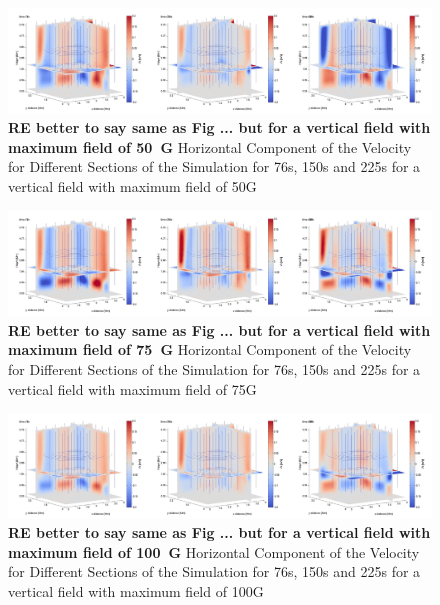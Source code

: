 \documentclass{aastex62}
\begin{document}
\begin{figure}[h]\label{vxplot_bv50g_76_150_225}
\includegraphics[scale=0.15]{imrescale/vx_bv50g_76_150_225.jpg}
\caption{{\bf RE better to say same as Fig ... but for a vertical field with maximum field of 50~G} Horizontal Component of the Velocity for Different Sections of the Simulation for 76s, 150s and 225s for a vertical field with maximum field of 50G}
\end{figure}


\begin{figure}[h]\label{vxplot_bv75g_76_150_225}
\includegraphics[scale=0.15]{imrescale/vx_bv75g_76_150_225.jpg}
\caption{{\bf RE better to say same as Fig ... but for a vertical field with maximum field of 75~G} Horizontal Component of the Velocity for Different Sections of the Simulation for 76s, 150s and 225s for a vertical field with maximum field of 75G}
\end{figure}

\begin{figure}[h]\label{vxplot_bv100g_76_150_225}
\includegraphics[scale=0.15]{imrescale/vx_bv100g_76_150_225.jpg}
\caption{{\bf RE better to say same as Fig ... but for a vertical field with maximum field of 100~G} Horizontal Component of the Velocity for Different Sections of the Simulation for 76s, 150s and 225s for a vertical field with maximum field of 100G}
\end{figure}
\end{document}
